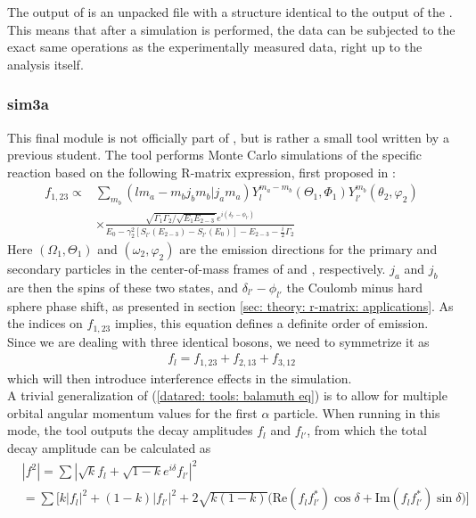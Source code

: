 The output of \simX{} is an unpacked \ROOT{} file with a structure identical to the output of the \Unpacker{}. This means that after a simulation is performed, the data can be subjected to the exact same operations as the experimentally measured data, right up to the analysis itself. 

\subsubsection{sim3a}
This final module is not officially part of \AUSAlib{}, but is rather a small tool written by a previous student. The tool performs Monte Carlo simulations of the specific reaction  based on the following R-matrix expression, first proposed in \cite{Balamuth}:
\begin{align} \label{datared: tools: balamuth eq}
	f_{1,23} \propto &\sum_{m_b} (lm_a-m_bj_bm_b | j_am_a)Y_l^{m_a-m_b}(\Theta_1, \Phi_1)Y_{l'}^{m_b}(\theta_2, \varphi_2) \nonumber \\
	&\times \frac{\sqrt{\Gamma_1 \Gamma_2/\sqrt{E_1E_{2-3}}}e^{i(\delta_{l'}-\phi_{l'})}}{E_0 - \gamma_2^2[S_{l'}(E_{2-3}) - S_{l'}(E_0)] - E_{2-3} - \frac{i}{2}\Gamma_2}
\end{align}
Here $(\Omega_1, \Theta_1)$ and $(\omega_2, \varphi_2)$ are the emission directions for the primary and secondary particles in the center-of-mass frames of  and , respectively. $j_a$ and $j_b$ are then the spins of these two states, and $\delta_{l'} - \phi_{l'}$ the Coulomb minus hard sphere phase shift, as presented in section \ref{sec: theory: r-matrix: applications}. As the indices on $f_{1,23}$ implies, this equation defines a definite order of emission. Since we are dealing with three identical bosons, we need to symmetrize it as
\begin{align*}
	f_l = f_{1,23} + f_{2,13} + f_{3,12}
\end{align*} 
which will then introduce interference effects in the simulation. \\

A trivial generalization of (\ref{datared: tools: balamuth eq}) is to allow for multiple orbital angular momentum values for the first $\alpha$ particle. When running in this mode, the tool outputs the decay amplitudes $f_l$ and $f_{l'}$, from which the total decay amplitude can be calculated as
\begin{align} \label{datared: tools: k delta eq}
	&|f^2| = \sum |\sqrt{k}f_l + \sqrt{1-k}e^{i\delta}f_{l'}|^2 \nonumber\\
	&= \sum \big[k|f_l|^2 + (1-k)|f_{l'}|^2 + 2\sqrt{k(1-k)}\big(\text{Re}(f_lf_{l'}^*)\cos\delta + \text{Im}(f_lf_{l'}^*)\sin\delta\big) \big]
\end{align}

